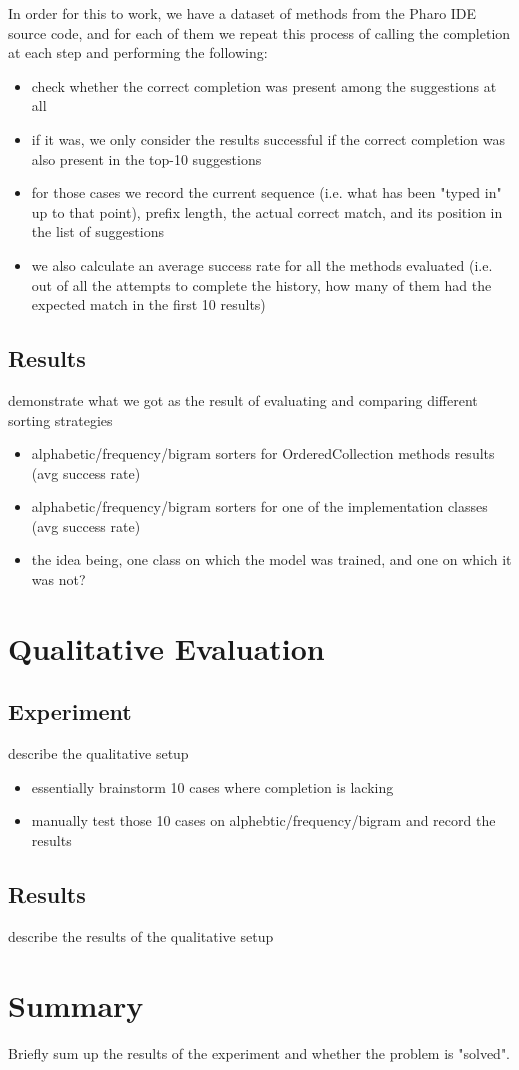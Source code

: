 In order for this to work, we have a dataset of methods from the Pharo IDE source code, and for each of them we repeat this process of calling the completion at each step and performing the following:
\begin{itemize}
    \item check whether the correct completion was present among the suggestions at all
    \item if it was, we only consider the results successful if the correct completion was also present in the top-10 suggestions
    \item for those cases we record the current sequence (i.e. what has been "typed in" up to that point), prefix length, the actual correct match, and its position in the list of suggestions
    \item we also calculate an average success rate for all the methods evaluated (i.e. out of all the attempts to complete the history, how many of them had the expected match in the first 10 results)
\end{itemize}

\subsection{Results}
demonstrate what we got as the result of evaluating and comparing different sorting strategies
\begin{itemize}
    \item alphabetic/frequency/bigram sorters for OrderedCollection methods results (avg success rate)
    \item alphabetic/frequency/bigram sorters for one of the implementation classes (avg success rate)
    \item the idea being, one class on which the model was trained, and one on which it was not?
\end{itemize}

\section{Qualitative Evaluation}
\label{sec:Evaluation-Qualitative}
\subsection{Experiment}
describe the qualitative setup
\begin{itemize}
    \item essentially brainstorm 10 cases where completion is lacking
    \item manually test those 10 cases on alphebtic/frequency/bigram and record the results
\end{itemize}
\subsection{Results}
describe the results of the qualitative setup

\section{Summary}
\label{sec:Evaluation-Summary}
Briefly sum up the results of the experiment and whether the problem is "solved".
